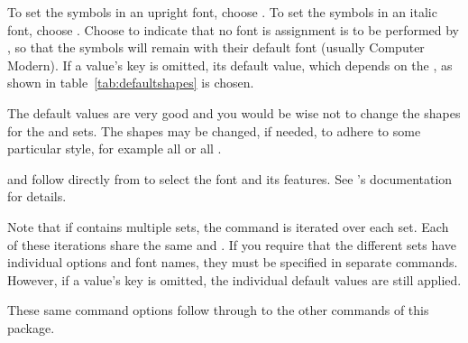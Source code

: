 \documentclass{ltxdockit}
\makeatletter
\def\topbottomrule{\noalign{\ifnum0=`}\fi
          \@aboverulesep=\aboverulesep
          \global\@belowrulesep=\belowrulesep
          \global\@thisruleclass=\@ne
          \@ifnextchar[{\@BTrule}{\@BTrule[\heavyrulewidth]}}
\makeatother
\begin{document}
\begin{ltxsyntax}
\begin{marglist}
\begin{optionlist}

\end{optionlist}
To set the symbols in an upright font, choose . To set the symbols in an italic font, choose . Choose  to indicate that no font is assignment is to be performed by , so that the symbols will remain with their default font (usually Computer Modern). If a value’s key is omitted, its default value, which depends on the , as shown in table~\ref{tab:defaultshapes} is chosen.

The default values are very good and you would be wise not to change the shapes for the  and  sets. The  shapes may be changed, if needed, to adhere to some particular style, for example all  or all .

\begin{table}\centering
{}
\caption{The default shapes for the symbol sets.}\label{tab:defaultshapes}
\end{table}

\item[\smash{\begin{tabular}[t]{@{}r@{}}\prm{font features}\\\prm{font name}\end{tabular}}]
 and  follow directly from  to select the font and its features. See ’s documentation for details.

\end{marglist}

Note that if  contains multiple sets, the command is iterated over each set. Each of these iterations share the same  and . If you require that the different sets have individual options and font names, they must be specified in separate commands. However, if a value’s key is omitted, the individual default values are still applied.

These same command options follow through to the other commands of this package.

\end{ltxsyntax}
\end{document}
